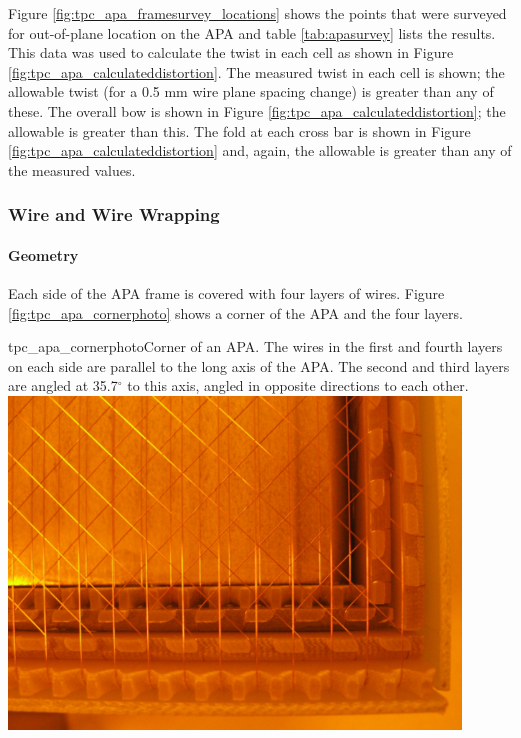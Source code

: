 Figure \ref{fig:tpc_apa_framesurvey_locations} shows the points that were surveyed for out-of-plane location on the APA and table \ref{tab:apasurvey} lists the results.  This data was used to calculate the twist in each cell as shown in Figure  \ref{fig:tpc_apa_calculateddistortion}. The measured twist in each cell is shown; the allowable twist (for a 0.5 mm wire plane spacing change) is greater than any of these.  The overall bow is shown in Figure \ref{fig:tpc_apa_calculateddistortion}; the allowable is greater than this.  The fold at each cross bar is shown in Figure \ref{fig:tpc_apa_calculateddistortion} and, again, the allowable is greater than any of the measured values. 



\subsubsection{Wire and Wire Wrapping}
\label{subsubsec:apa_wire_wrap}

\paragraph{Geometry}

Each side of the APA frame is covered with four layers of wires.  Figure \ref{fig:tpc_apa_cornerphoto} shows a corner of the APA and the four layers.

\begin{cdrfigure}{tpc_apa_cornerphoto}{Corner of an APA.  The wires in the first and fourth layers on each side are parallel to the long axis of the APA.  The second and third layers are angled at 35.7$^{\circ}$ to this axis, angled in opposite directions to each other.}
\includegraphics[width=0.9\textwidth]{figures/tpc_apa_cornerphoto.png} 
\end{cdrfigure}

